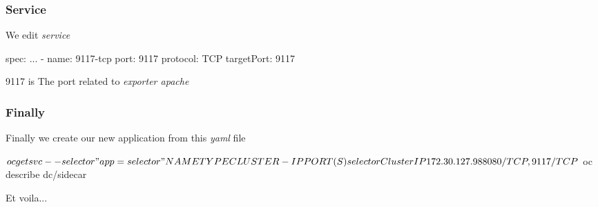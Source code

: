 \begin{frame}[fragile]
  \frametitle{Service}
  We edit \emph{service}

  \begin{yamlcode}
    spec:
      ...
      - name: 9117-tcp
        port: 9117
        protocol: TCP
        targetPort: 9117
  \end{yamlcode}
  9117 is The port related to \emph{exporter apache}
\end{frame}

\begin{frame}[fragile]
  \frametitle{Finally}
  Finally we create our new application from this \emph{yaml} file
  \begin{bashcode}
    $ oc get svc --selector "app=selector"
    NAME      TYPE        CLUSTER-IP      PORT(S)           
    selector  ClusterIP   172.30.127.98   8080/TCP,9117/TCP
    $ oc describe dc/sidecar
  \end{bashcode}
  Et voila...
\end{frame}
